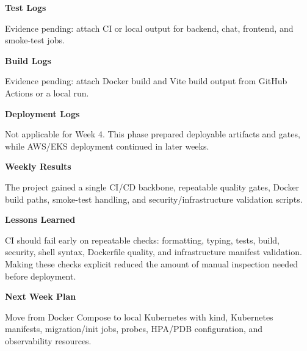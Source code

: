 \vspace{0.5em}\noindent\textbf{Test Logs}\par

Evidence pending: attach CI or local output for backend, chat, frontend,
and smoke-test jobs.

\vspace{0.5em}\noindent\textbf{Build Logs}\par

Evidence pending: attach Docker build and Vite build output from GitHub
Actions or a local run.

\vspace{0.5em}\noindent\textbf{Deployment Logs}\par

Not applicable for Week 4. This phase prepared deployable artifacts and
gates, while AWS/EKS deployment continued in later weeks.

\vspace{0.5em}\noindent\textbf{Weekly Results}\par

The project gained a single CI/CD backbone, repeatable quality gates,
Docker build paths, smoke-test handling, and security/infrastructure
validation scripts.

\vspace{0.5em}\noindent\textbf{Lessons Learned}\par

CI should fail early on repeatable checks: formatting, typing, tests,
build, security, shell syntax, Dockerfile quality, and infrastructure
manifest validation. Making these checks explicit reduced the amount of
manual inspection needed before deployment.

\vspace{0.5em}\noindent\textbf{Next Week Plan}\par

Move from Docker Compose to local Kubernetes with kind, Kubernetes
manifests, migration/init jobs, probes, HPA/PDB configuration, and
observability resources.
